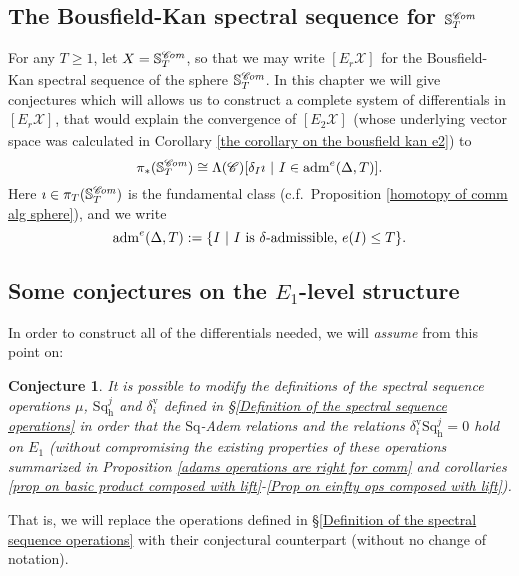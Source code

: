 \documentclass[11pt]{amsart} \renewcommand{\baselinestretch}{1.2}
\theoremstyle{plain}
\newtheorem{conjecture}{Conjecture}
\numberwithin{equation}{section} %
\theoremstyle{plain}
\newtheorem{conjecture}{Conjecture}
\numberwithin{equation}{chapter} %
\newcommand{\scrC}{\mathscr{C}}
\newcommand{\calx}{\mathcal{X}}
\newcommand{\CommOperad}{{\scrC}}
\newcommand{\minDimP}{\overline{m}}
\newcommand{\Sq}{\mathrm{Sq}}
\newcommand{\aDTnoplus}{\mathrm{adm}(\Delta,T)}
\newcommand{\aDTe}{\mathrm{adm}^{\smash{e}}(\Delta,T)}
\newcommand{\aDTm}{\mathrm{adm}^{\smash{\minDimP}}(\Delta,T)}
\newcommand{\aDTme}{\mathrm{adm}^{\smash{\minDimP\setminus e}}(\Delta,T)}
\newcommand{\algs}{{\scrC\!\textit{\normalfont\textit{om}}}}
\newcommand{\E}[5]{[E^{#1}_{#2}#3]^{#4}_{#5}}
\newcommand{\uver}{^\mathrm{v}}
\newcommand{\dhor}{_\mathrm{h}}
\newcommand{\Sqh}{\mathrm{Sq}\dhor}
\newcommand{\deltav}{\delta\uver}
\newcommand{\SectionOrChapter}[1]{\section{\textbf{#1}}}
\newcommand{\SubsectionOrSection}[1]{\subsection{#1}}
\begin{document}
\begin{The Bousfield-Kan spectral sequence for a sphere}
\SectionOrChapter{The Bousfield-Kan spectral sequence for $\mathbb{S}^{\algs}_T$}
\label{The Bousfield-Kan spectral sequence for a sphere}
For any $T\geq1$, let $X=\mathbb{S}^{\algs}_T$, so that we may write $\E{}{r}{\calx}{}{}$ for the Bousfield-Kan spectral sequence of the sphere $\mathbb{S}^{\algs}_T$.  In this chapter we will give conjectures which will allows us to construct a complete system of differentials in $\E{}{r}{\calx}{}{}$, that would explain the convergence of $\E{}{2}{\calx}{}{}$ (whose underlying vector space was calculated in Corollary \ref{the corollary on the bousfield kan e2}) to
\[\pi_*(\mathbb{S}^{\algs}_T)\cong \Lambda(\CommOperad)[\delta_I\imath\ |\ I\in \aDTe].\]
Here $\imath\in \pi_T(\mathbb{S}^{\algs}_T)$ is the fundamental class (c.f.\ Proposition \ref{homotopy of comm alg sphere}), and we write
\[\aDTe:=\{I\ |\ \textup{$I$ is $\delta$-admissible, $e(I)\leq T$}\}.\]

\SubsectionOrSection{Some conjectures on the $E_1$-level structure}
\label{Some conjectures on the E1-level structure}
In order to construct all of the differentials needed, we will \emph{assume} from this point on:
\begin{conjecture}
\label{conjec1}
It is possible to modify the definitions of the spectral sequence operations $\mu$, $\Sqh^j$ and $\deltav_i$ defined in \S\ref{Definition of the spectral sequence operations} in order that the $\Sq$-Adem relations and the relations $\deltav_i\Sqh^j=0$ hold on $E_1$ (without compromising the existing properties of these operations summarized in Proposition \ref{adams operations are right for comm} and corollaries \ref{prop on basic product composed with lift}-\ref{Prop on einfty ops composed with lift}).
\end{conjecture}
\noindent That is, we will replace the operations defined in \S\ref{Definition of the spectral sequence operations} with their conjectural counterpart (without no change of notation).


\end{The Bousfield-Kan spectral sequence for a sphere}
\end{document}
